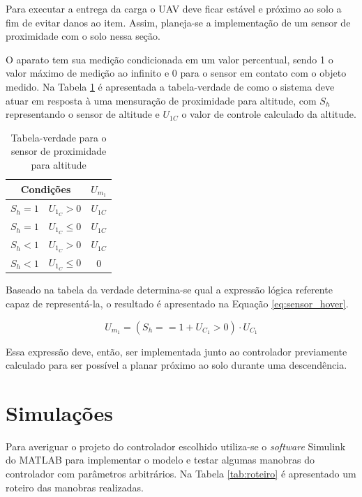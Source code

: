 \documentclass[main.tex]{subfiles}
\begin{document}
Para executar a entrega da carga o UAV deve ficar estável e próximo ao solo a fim de evitar danos ao item. Assim, planeja-se a implementação de um sensor de proximidade com o solo  nessa seção.

O aparato tem sua medição condicionada em um valor percentual, sendo 1 o valor máximo de medição ao infinito e 0 para o sensor em contato com o objeto medido. Na Tabela \ref{tab:tabela_verdade} é apresentada a tabela-verdade de como o sistema deve atuar em resposta à uma mensuração de proximidade para altitude, com $S_h$ representando o sensor de altitude e $U_{1C}$ o valor de controle calculado da altitude.

\begin{table}[!h]
    \centering
    \caption{Tabela-verdade para o sensor de proximidade para altitude}
    \begin{tabular}{|c|c|c|}
        \hline
        \multicolumn{2}{|c|}{Condições} &      $U_{m_1}$\\\hline
        $S_h = 1$       & $U_{1_C} > 0$          &      $U_{1C}$\\
        $S_h = 1$       & $U_{1_C} \leq 0$       &      $U_{1C}$\\
        $S_h < 1$       & $U_{1_C} > 0$          &      $U_{1C}$\\
        $S_h < 1$       & $U_{1_C} \leq 0$       &      0\\
        \hline
        \end{tabular}
    \label{tab:tabela_verdade}
\end{table}

Baseado na tabela da verdade determina-se qual a expressão lógica referente capaz de representá-la, o resultado é apresentado na Equação \ref{eq:sensor_hover}.

\begin{equation}\label{eq:sensor_hover}
    U_{m_1} =    (S_h == 1 + U_{C_1} > 0)\cdot U_{C_1}
\end{equation}

Essa expressão deve, então, ser implementada junto ao controlador previamente calculado para ser possível a planar próximo ao solo durante uma descendência.

\newpage
\section{Simulações}

Para averiguar o projeto do controlador escolhido utiliza-se o \textit{software} Simulink do MATLAB para implementar o modelo e testar algumas manobras do controlador com parâmetros arbitrários. Na Tabela \ref{tab:roteiro} é apresentado um roteiro das manobras realizadas.
\end{document}

